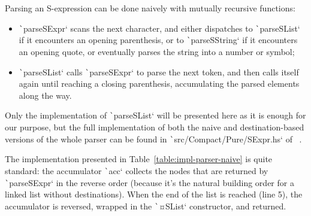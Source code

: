 \documentclass[english]{jflart}
\begin{document}
Parsing an S-expression can be done naively with mutually recursive functions:
\begin{itemize}
  \item \texttt`parseSExpr` scans the next character, and either dispatches to \texttt`parseSList` if it encounters an opening parenthesis, or to \texttt`parseSString` if it encounters an opening quote, or eventually parses the string into a number or symbol;
  \item \texttt`parseSList` calls \texttt`parseSExpr` to parse the next token, and then calls itself again until reaching a closing parenthesis, accumulating the parsed elements along the way.
\end{itemize}

Only the implementation of \texttt`parseSList` will be presented here as it is enough for our purpose, but the full implementation of both the naive and destination-based versions of the whole parser can be found in \texttt`src/Compact/Pure/SExpr.hs` of~\cite{linear_dest} .

The implementation presented in Table~\ref{table:impl-parser-naive} is quite standard: the accumulator \texttt`acc` collects the nodes that are returned by \texttt`parseSExpr` in the reverse order (because it's the natural building order for a linked list without destinations). When the end of the list is reached (line 5), the accumulator is reversed, wrapped in the \texttt`¤SList` constructor, and returned.
\end{document}
